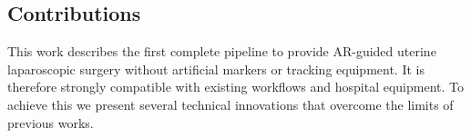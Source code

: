 

\subsection{Contributions}
\label{sec:contributions}
This work describes the first complete pipeline to provide AR-guided uterine laparoscopic surgery without artificial markers or tracking equipment. It is therefore strongly compatible with existing workflows and hospital equipment. To achieve this we present several technical innovations that overcome the limits of previous works.%

